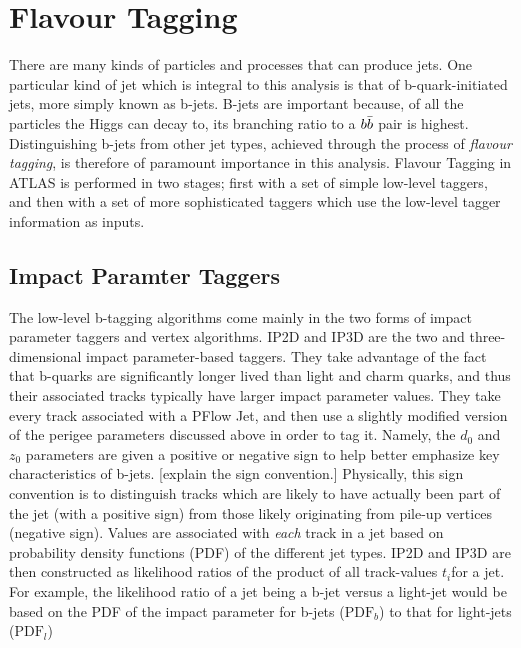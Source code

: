 
    \section{Flavour Tagging}
        
        There are many kinds of particles and processes that can produce jets.
        One particular kind of jet which is integral to this analysis is that of b-quark-initiated jets,
            more simply known as b-jets.
        B-jets are important because, of all the particles the Higgs can decay to,
            its branching ratio to a $b \bar{b}$ pair is highest.
        Distinguishing b-jets from other jet types,
            achieved through the process of \textit{flavour tagging},
            is therefore of paramount importance in this analysis.
        Flavour Tagging in ATLAS is performed in two stages;
            first with a set of simple low-level taggers,
            and then with a set of more sophisticated taggers which use the low-level tagger information as inputs.

        \subsection{Impact Paramter Taggers}

            The low-level b-tagging algorithms come mainly in the two forms of impact parameter taggers and vertex algorithms.
            IP2D and IP3D are the two and three-dimensional impact parameter-based taggers.
            They take advantage of the fact that b-quarks are significantly longer lived than light and charm quarks,
                and thus their associated tracks typically have larger impact parameter values.
            They take every track associated with a PFlow Jet,
                and then use a slightly modified version of the perigee parameters discussed above in order to tag it.
            Namely, the $d_0$ and $z_0$ parameters are given a positive or negative sign to help better emphasize key characteristics of b-jets.
            [explain the sign convention.]
            Physically, this sign convention is to distinguish tracks which are likely to have actually been part of the jet (with a positive sign)
                from those likely originating from pile-up vertices (negative sign).
            Values are associated with \textit{each} track in a jet based on probability density functions (PDF) of the different jet types.
            IP2D and IP3D are then constructed as likelihood ratios of the product of all track-values $t_i$for a jet.
            For example, the likelihood ratio of a jet being a b-jet versus a light-jet would be based on
                the PDF of the impact parameter for b-jets ($\textrm{PDF}_b$) to that for light-jets ($\textrm{PDF}_l$)

